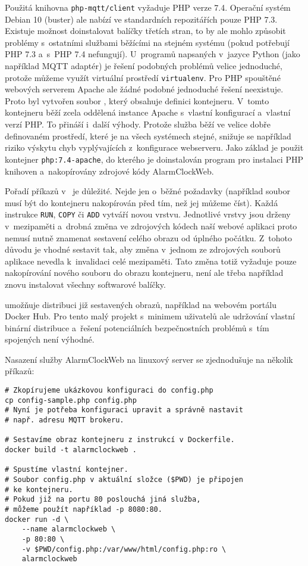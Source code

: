 Použitá knihovna \texttt{php-mqtt/client} vyžaduje PHP verze 7.4. Operační
systém Debian 10 (buster) ale nabízí ve standardních repozitářích pouze PHP
7.3. Existuje možnost doinstalovat balíčky třetích stran, to by ale mohlo
způsobit problémy s~ostatními službami běžícími na stejném systému (pokud
potřebují PHP 7.3 a~s~PHP 7.4 nefungují).
U~programů napsaných v~jazyce Python (jako například MQTT adaptér) je řešení
podobných problémů velice jednoduché, protože můžeme využít virtuální prostředí
\texttt{virtualenv}. Pro PHP spouštěné webových serverem Apache ale žádné
podobné jednoduché řešení neexistuje.
Proto byl vytvořen soubor , který obsahuje definici
kontejneru. V~tomto kontejneru běží zcela oddělená instance Apache s~vlastní
konfigurací a~vlastní verzí PHP. To přináší i~další výhody. Protože služba běží
ve velice dobře definovaném prostředí, které je na všech systémech stejné,
snižuje se například riziko výskytu chyb vyplývajících z~konfigurace
webserveru. Jako základ je použit kontejner \texttt{php:7.4-apache}, do kterého
je doinstalován program pro instalaci PHP knihoven 
a~nakopírovány zdrojové kódy AlarmClockWeb.

Pořadí příkazů v~ je důležité. Nejde jen o~běžné požadavky
(například soubor musí být do kontejneru nakopírován před tím, než jej můžeme
číst). Každá instrukce \texttt{RUN}, \texttt{COPY} či \texttt{ADD} vytváří
novou vrstvu. Jednotlivé vrstvy jsou drženy v~mezipaměti a~drobná změna ve
zdrojových kódech naší webové aplikaci proto nemusí nutně znamenat sestavení
celého obrazu od úplného počátku. Z~tohoto důvodu je vhodné sestavit
 tak, aby změna v~jednom ze zdrojových souborů aplikace
nevedla k~invalidaci celé mezipaměti. Tato změna totiž vyžaduje pouze
nakopírování nového souboru do obrazu kontejneru, není ale třeba například
znovu instalovat všechny softwarové balíčky.

 umožňuje distribuci již sestavených obrazů, například na
webovém portálu Docker Hub. Pro tento malý projekt s~minimem uživatelů ale
udržování vlastní binární distribuce a~řešení potenciálních bezpečnostních
problémů s~tím spojených není výhodné.


Nasazení služby AlarmClockWeb na linuxový server se zjednodušuje na několik
příkazů:
\begin{lstlisting}[language=mybash,style=numbers]
# Zkopírujeme ukázkovou konfiguraci do config.php
cp config-sample.php config.php
# Nyní je potřeba konfiguraci upravit a správně nastavit
# např. adresu MQTT brokeru.

# Sestavíme obraz kontejneru z instrukcí v Dockerfile.
docker build -t alarmclockweb .

# Spustíme vlastní kontejner.
# Soubor config.php v aktuální složce ($PWD) je připojen
# ke kontejneru.
# Pokud již na portu 80 poslouchá jiná služba,
# můžeme použít například -p 8080:80.
docker run -d \
    --name alarmclockweb \
    -p 80:80 \
    -v $PWD/config.php:/var/www/html/config.php:ro \
    alarmclockweb
\end{lstlisting}

